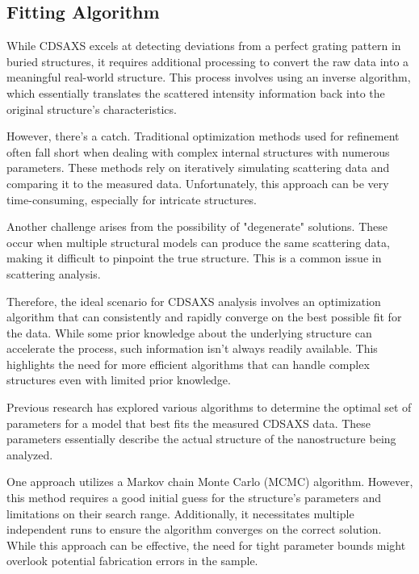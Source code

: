 \subsection{Fitting Algorithm}

While CDSAXS excels at detecting deviations from a perfect grating pattern in buried structures, it requires additional processing to convert the raw data into a meaningful real-world structure. This process involves using an inverse algorithm, which essentially translates the scattered intensity information back into the original structure's characteristics.

\medskip

However, there's a catch. Traditional optimization methods used for refinement often fall short when dealing with complex internal structures with numerous parameters. These methods rely on iteratively simulating scattering data and comparing it to the measured data. Unfortunately, this approach can be very time-consuming, especially for intricate structures.

\medskip

Another challenge arises from the possibility of "degenerate" solutions. These occur when multiple structural models can produce the same scattering data, making it difficult to pinpoint the true structure. This is a common issue in scattering analysis.

\medskip

Therefore, the ideal scenario for CDSAXS analysis involves an optimization algorithm that can consistently and rapidly converge on the best possible fit for the data. While some prior knowledge about the underlying structure can accelerate the process, such information isn't always readily available. This highlights the need for more efficient algorithms that can handle complex structures even with limited prior knowledge.

\medskip

Previous research has explored various algorithms to determine the optimal set of parameters for a model that best fits the measured CDSAXS data. These parameters essentially describe the actual structure of the nanostructure being analyzed.

\medskip

One approach utilizes a Markov chain Monte Carlo (MCMC) algorithm. However, this method requires a good initial guess for the structure's parameters and limitations on their search range. Additionally, it necessitates multiple independent runs to ensure the algorithm converges on the correct solution. While this approach can be effective, the need for tight parameter bounds might overlook potential fabrication errors in the sample.

